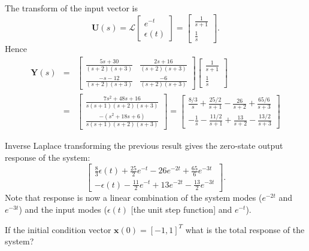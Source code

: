 The transform of the input vector is
\[\mathbf{U}(s) = \mathcal{L}\left[\begin{array}{c}
  e^{-t} \\
  \epsilon(t)
\end{array}\right] = \left[\begin{array}{c}
  \frac{1}{s+1} \\
  \frac{1}{s}
\end{array}\right].\] Hence
\begin{eqnarray*}\mathbf{Y}(s) &=& \left[\begin{array}{cc}
  \frac{5s+30}{(s+2)(s+3)} & \frac{2s+16}{(s+2)(s+3)} \\
   \frac{-s-12}{(s+2)(s+3)} & \frac{-6}{(s+2)(s+3)}
\end{array}\right]\left[\begin{array}{c}
  \frac{1}{s+1} \\
  \frac{1}{s}
\end{array}\right]\\
&=&\left[\begin{array}{c}
  \frac{7s^2+48s+16}{s(s+1)(s+2)(s+3)} \\
  \frac{-(s^2+18s+6)}{s(s+1)(s+2)(s+3)}
\end{array}\right] = \left[\begin{array}{c}
  \frac{8/3}{s}+\frac{25/2}{s+1}-\frac{26}{s+2}+\frac{65/6}{s+3} \\
   -\frac{1}{s}-\frac{11/2}{s+1}+\frac{13}{s+2}-\frac{13/2}{s+3}
\end{array}\right]
\end{eqnarray*}

Inverse Laplace transforming the
previous result gives the zero-state output response of the
system: \[\left[\begin{array}{c}
  \frac{8}{3}\epsilon(t)+\frac{25}{2}e^{-t}-26e^{-2t}+\frac{65}{6}e^{-3t} \\
   -\epsilon(t)-\frac{11}{2}e^{-t}+13e^{-2t}-\frac{13}{2}e^{-3t}
\end{array}\right].\]
Note that response is now a linear combination of the system modes
($e^{-2t}$ and $e^{-3t}$) and the input modes ($\epsilon(t)$ [the
unit step function] and $e^{-t}$).

If the initial condition vector $\mathbf{x}(0)=[-1, 1]^T$ what is
the total response of the system?


